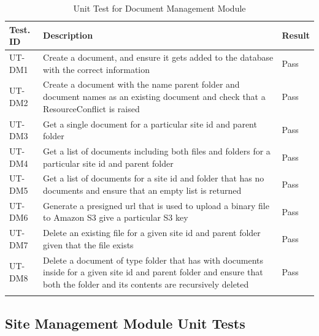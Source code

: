 \documentclass[12pt, titlepage]{article}
\begin{document}
\begin{longtable}{|m{2cm}|m{10cm}|m{1.4cm}|}
  \hline
  \textbf{Test. ID} & \textbf{Description} & \textbf{Result} \\ \hline
  UT-DM1 & Create a document, and ensure it gets added to the
  database with the correct information & Pass\\ \hline
  UT-DM2 & Create a document with the name parent folder and document names as
  an existing document and check that a ResourceConflict is raised &
  Pass\\ \hline
  UT-DM3 & Get a single document for a particular site id and parent
  folder & Pass\\ \hline
  UT-DM4 & Get a list of documents including both files and folders for a
  particular site id and parent folder & Pass\\ \hline
  UT-DM5 & Get a list of documents for a site id and folder that has no
  documents and ensure that an empty list is returned & Pass\\ \hline
  UT-DM6 & Generate a presigned url that is used to upload a binary file to
  Amazon S3 give a particular S3 key & Pass\\ \hline
  UT-DM7 & Delete an existing file for a given site id and parent folder given
  that the file exists & Pass\\ \hline
  UT-DM8 & Delete a document of type folder that has with documents
  inside for a given site id
  and parent folder and ensure that both the folder and its contents are
  recursively deleted & Pass\\ \hline
  \caption{Unit Test for Document Management Module}
\end{longtable}

\subsection{Site Management Module Unit Tests}
\end{document}
